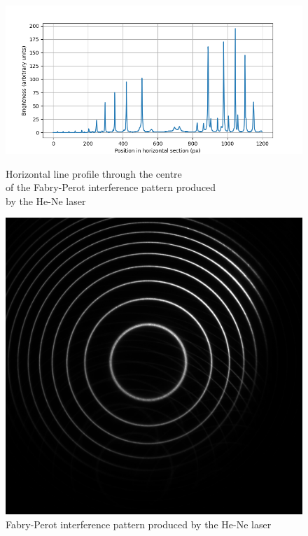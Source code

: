 \documentclass[11pt]{article}
\begin{document}
\begin{figure}[h!]
    \centering
    \begin{minipage}[c]{0.67\textwidth}
        \centering
        \includegraphics[width=\linewidth]{line profiles/HeNe laser.png}
        \captionsetup{justification=centering}
        \caption{Horizontal line profile through the centre \\
        of the Fabry-Perot interference pattern produced \\
        by the He-Ne laser}
        \label{img: He-Ne line profile}
    \end{minipage}
    \begin{minipage}[c]{0.3\textwidth}
        \centering
        \includegraphics[width=\linewidth]{line profiles/helium neon laser (paper smooted).png}
        \captionsetup{justification=centering}
        \caption{Fabry-Perot interference pattern produced by the He-Ne laser}
        \label{img: He-Ne image}
    \end{minipage} 
\end{figure}
\end{document}
